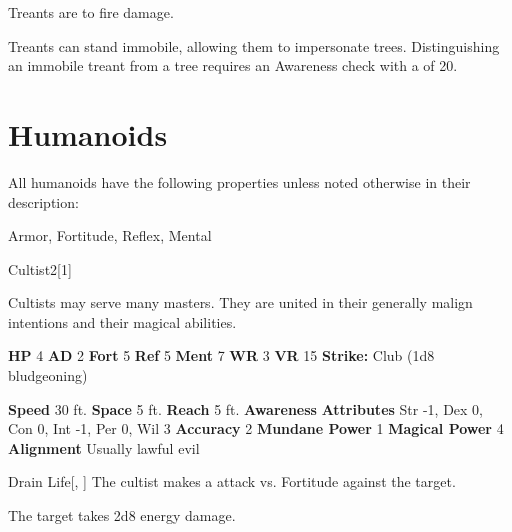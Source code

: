         Treants are  to fire damage.
      
        Treants can stand immobile, allowing them to impersonate trees.
        Distinguishing an immobile treant from a tree requires an Awareness check with a  of 20.
  
  
        \section{Humanoids}

        All humanoids have the following properties unless noted otherwise in their description:
        
    
     Armor,
     Fortitude,
     Reflex,
     Mental
  
  
      
  \begin{monsection}{Cultist}{2}[1]
    \vspace{-1em}\vspace{-1em}
    \vspace{0em}

    
      Cultists may serve many masters.
      They are united in their generally malign intentions and their magical abilities.
    
    

    \begin{spellcontent}
      \begin{spelltargetinginfo}
        \pari \textbf{HP} 4 \monsep
          \textbf{AD} 2 \monsep
          \textbf{Fort} 5 \monsep
          \textbf{Ref} 5 \monsep
          \textbf{Ment} 7
        \pari \textbf{WR} 3 \monsep
        \textbf{VR} 15
        \pari \textbf{Strike:}
            Club  (1d8 bludgeoning)
      \end{spelltargetinginfo}
    \end{spellcontent}
    \begin{monsterfooter}
      \pari \textbf{Speed} 30 ft. \monsep
        \textbf{Space} 5 ft. \monsep
        \textbf{Reach} 5 ft.
      \pari \textbf{Awareness} 
      \pari \textbf{Attributes}
        Str -1, Dex 0,
        Con 0, Int -1,
        Per 0, Wil 3
      \pari \textbf{Accuracy} 2 \monsep
        \textbf{Mundane Power} 1 \monsep
      \textbf{Magical Power} 4
      \pari \textbf{Alignment} Usually lawful evil
    \end{monsterfooter}
  \end{monsection}
  \begin{freeability}{Drain Life}[, ]
       The cultist makes a  attack
        vs. Fortitude against the target.
    
    \hit The target takes 2d8 energy damage.
    \end{freeability}
  
